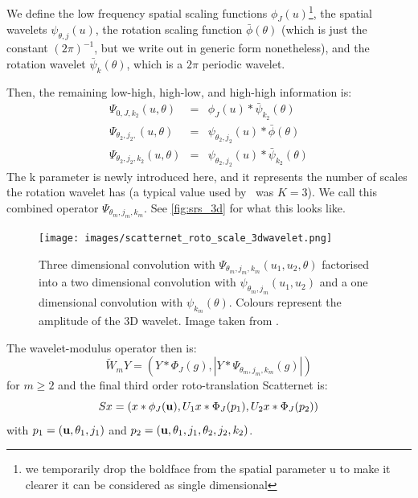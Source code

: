   We define the low frequency spatial scaling functions $\phi_J(u)$\footnote{we
  temporarily drop the boldface from the spatial parameter u to make it clearer
  it can be considered as single dimensional}, the spatial wavelets
  $\psi_{\theta, j}(u)$, the rotation scaling function $\bar{\phi}(\theta)$
  (which is just the constant $(2\pi)^{-1}$, but we write out in generic form
  nonetheless), and the rotation wavelet $\bar{\psi}_k(\theta)$, which is
  a $2\pi$ periodic wavelet.

  Then, the remaining low-high, high-low, and high-high information is:
  \begin{eqnarray}
    \Psi_{0, J, k_2}(u, \theta) & = & \phi_J(u) \ast \bar{\psi}_{k_2}(\theta) \\
    \Psi_{\theta_2, j_2, } (u, \theta) & = & \psi_{\theta_2, j_2}(u) \ast
      \bar{\phi}(\theta) \\
    \Psi_{\theta_2, j_2, k_2}(u, \theta) & = & \psi_{\theta_2, j_2}(u) \ast
      \bar{\psi}_{k_2}(\theta)
  \end{eqnarray}
  The k parameter is newly introduced here, and it represents the number of
  scales the rotation wavelet has (a typical value used by \Sifre\ was $K=3$).
  We call this combined operator $\Psi_{\theta_m, j_m, k_m}$. See
  \autoref{fig:srs_3d} for what this looks like.

  \begin{figure}
    \centering
      \texttt{[image: images/scatternet\_roto\_scale\_3dwavelet.png]}
      \caption[Three dimensional convolution with roto-scale wavelet]
              {Three dimensional convolution with  $\Psi_{\theta_m, j_m,
              k_m}(u_1, u_2, \theta)$ factorised into a two dimensional convolution with
              $\psi_{\theta_m, j_m}(u_1, u_2)$ and a one dimensional convolution with
              $\psi_{k_m}(\theta)$. Colours represent the amplitude of the 3D
              wavelet. Image taken from \citep{sifre_rotation_2013}.}
      \label{fig:srs_3d}
  \end{figure}

  The wavelet-modulus operator then is:
  \begin{equation}
    \tilde{W}_m Y = \left( Y \ast \Phi_J(g), |Y \ast \Psi_{\theta_m, j_m, k_m}
      (g)| \right)
  \end{equation}
  for $m\ge 2$ and the final third order roto-translation Scatternet is:
  \begin{equation}
    Sx = (x\ast \phi_J(\mathbf{u}), U_1x \ast \Phi_J(p_1), U_2x \ast \Phi_J(p_2))
    \label{eq:roto_shift}
  \end{equation}
  with $p_1 = (\mathbf{u}, \theta_1, j_1)$ and $p_2=(\mathbf{u}, \theta_1, j_1,
  \theta_2, j_2, k_2)$.


